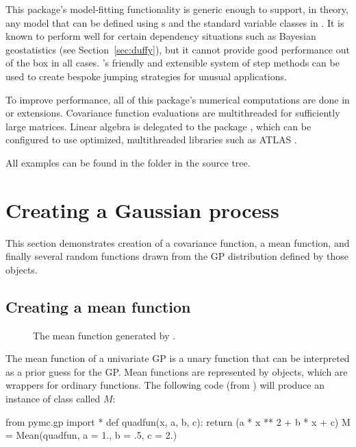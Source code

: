 \documentclass[article]{jss}
\begin{document}
This package's model-fitting functionality is generic enough to support, in theory, any model that can be defined using s and the standard variable classes in . It is known to perform well for certain dependency situations such as Bayesian geostatistics (see Section~\ref{sec:duffy}), but it cannot provide good performance out of the box in all cases. 's friendly and extensible system of step methods can be used to create bespoke jumping strategies for unusual applications.

To improve performance, all of this package's numerical computations are done in  or  extensions. Covariance function evaluations are multithreaded for sufficiently large matrices. Linear algebra is delegated to the  package \citep{numpybook}, which can be configured to use optimized, multithreaded libraries such as ATLAS \citep{atlas}. 

\medskip
All examples can be found in the folder  in the  source tree.

\section{Creating a Gaussian process}\label{sub:inst}


This section demonstrates creation of a covariance function, a mean function, and finally several random functions drawn from the GP distribution defined by those objects.

\subsection{Creating a mean function}\label{subsub:mean}

\begin{figure}
    \centering
    \caption{The mean function generated by .}
    \label{fig:mean}
\end{figure}

The mean function of a univariate GP is a unary function that can be interpreted as a prior guess for the GP. Mean functions are represented by  objects, which are wrappers for ordinary  functions. The following code (from ) will produce an instance of class  called $M$:
\begin{CodeChunk}
\begin{CodeInput}
from pymc.gp import *
def quadfun(x, a, b, c):
    return (a * x ** 2 + b * x + c)
M = Mean(quadfun, a = 1., b = .5, c = 2.)        
\end{CodeInput}
\end{CodeChunk}
\end{document}
